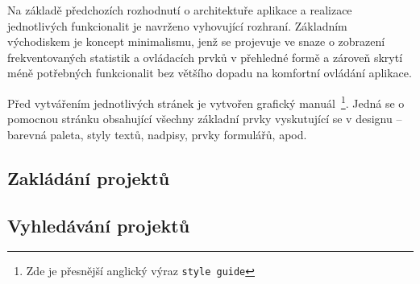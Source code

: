 Na základě předchozích rozhodnutí o architektuře aplikace a realizace jednotlivých funkcionalit je navrženo vyhovující rozhraní. Základním východiskem je koncept minimalismu, jenž se projevuje ve snaze o zobrazení frekventovaných statistik a ovládacích prvků v přehledné formě a zároveň skrytí méně potřebných funkcionalit bez většího dopadu na komfortní ovládání aplikace.

Před vytvářením jednotlivých stránek je vytvořen grafický manuál~\footnote{Zde je přesnější anglický výraz \texttt{style guide}}. Jedná se o pomocnou stránku obsahující všechny základní prvky vyskutující se v designu -- barevná paleta, styly textů, nadpisy, prvky formulářů, apod.



\subsection{Zakládání projektů}

\subsection{Vyhledávání projektů}


